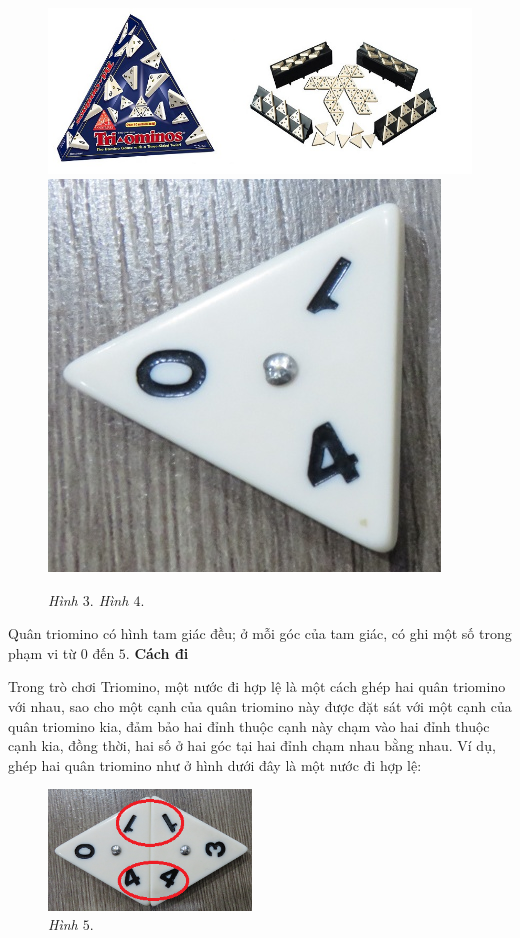 	\begin{figure}[H]
		\centering
		\vspace*{-5pt}
		\captionsetup{labelformat=empty, justification=centering}
		\includegraphics[height=0.25\textwidth]{dom-07}
		\includegraphics[height=0.25\textwidth]{dom-08}
		\caption{\textit{\small Hình $3.$ \hspace{90pt}Hình $4.$}}
		\vspace*{-5pt}
	\end{figure}
	Quân triomino có hình tam giác đều; ở mỗi góc của tam giác, có ghi một số trong phạm vi từ $0$ đến $5$.
	\vskip 0.1cm
	\newpage
	{\bf Cách đi}
	\vskip 0.1cm
	\begin{multicols}{2}
	Trong trò chơi Triomino, một nước đi hợp lệ là một cách ghép hai quân triomino với nhau, sao cho một cạnh của quân triomino này được đặt sát với một cạnh của quân \linebreak triomino kia, đảm bảo hai đỉnh thuộc cạnh này chạm vào hai đỉnh thuộc cạnh kia, đồng thời, hai số ở hai góc tại hai đỉnh chạm nhau
	bằng nhau. Ví dụ, ghép hai quân triomino như ở hình dưới đây là một nước đi hợp lệ:
	\begin{figure}[H]
		\centering
		\vspace*{-5pt}
		\captionsetup{labelformat=empty, justification=centering}
		\includegraphics[width=0.48\textwidth]{dom-09}
		\caption{\textit{\small Hình $5.$}}
	\end{figure}
	\end{multicols}
